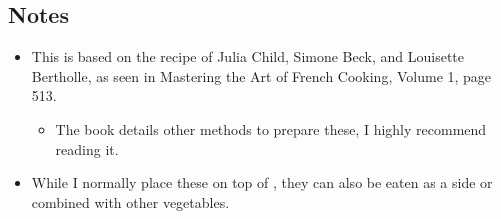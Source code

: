 \begin{multicols}{2}
\subsection*{Notes}
\begin{itemize}
    \item This is based on the recipe of Julia Child, Simone Beck, and Louisette Bertholle, as seen in Mastering the Art of French Cooking, Volume 1, page 513.
    \begin{itemize}
        \item The book details other methods to prepare these, I highly recommend reading it.
    \end{itemize}
    \item While I normally place these on top of , they can also be eaten as a side or combined with other vegetables.
\end{itemize}
\end{multicols}
\clearpage